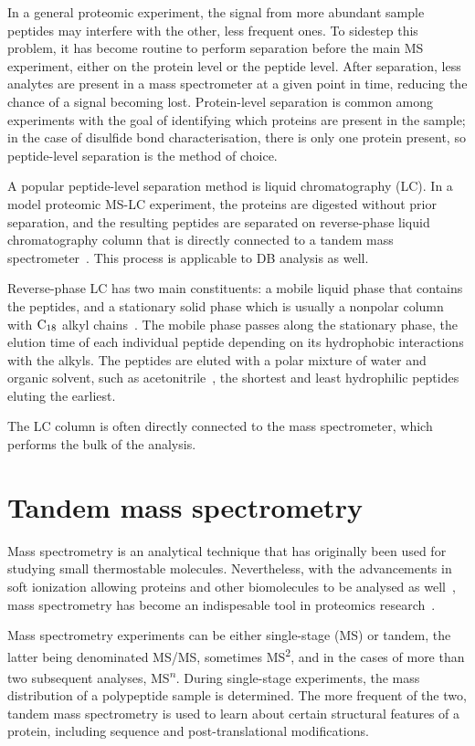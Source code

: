 In a general proteomic experiment, the signal from more abundant sample peptides may interfere with the other, less frequent ones. To sidestep this problem, it has become routine to perform separation before the main MS experiment, either on the protein level or the peptide level. After separation, less analytes are present in a mass spectrometer at a given point in time, reducing the chance of a signal becoming lost. Protein-level separation is common among experiments with the goal of identifying which proteins are present in the sample; in the case of disulfide bond characterisation, there is only one protein present, so peptide-level separation is the method of choice.

A popular peptide-level separation method is liquid chromatography (LC). In a model proteomic MS-LC experiment, the proteins are digested without prior separation, and the resulting peptides are separated on reverse-phase liquid chromatography column that is directly connected to a tandem mass spectrometer~\cite{washburn2001large}. This process is applicable to DB analysis as well.

Reverse-phase LC has two main constituents: a mobile liquid phase that contains the peptides, and a stationary solid phase which is usually a nonpolar column with \(\ce{C18}\) alkyl chains~\cite{chang1976high}. The mobile phase passes along the stationary phase, the elution time of each individual peptide depending on its hydrophobic interactions with the alkyls. The peptides are eluted with a polar mixture of water and organic solvent, such as acetonitrile~\cite{frohlich2006proteome}, the shortest and least hydrophilic peptides eluting the earliest.

The LC column is often directly connected to the mass spectrometer, which performs the bulk of the analysis.


\section{Tandem mass spectrometry}\label{sec:msms}

Mass spectrometry is an analytical technique that has originally been used for studying small thermostable molecules. Nevertheless, with the advancements in soft ionization allowing proteins and other biomolecules to be analysed as well~\cite{fenn1989electrospray}, mass spectrometry has become an indispesable tool in proteomics research~\cite{collins2003human}.

Mass spectrometry experiments can be either single-stage (MS) or tandem, the latter being denominated MS/MS, sometimes MS\textsuperscript{2}, and in the cases of more than two subsequent analyses, MS\textsuperscript{\(n\)}. During single-stage experiments, the mass distribution of a polypeptide sample is determined. The more frequent of the two, tandem mass spectrometry is used to learn about certain structural features of a protein, including sequence and post-translational modifications.~\cite{domon2006mass}

